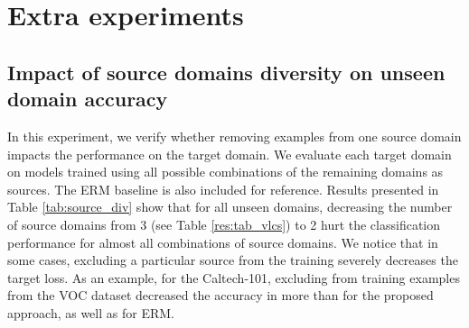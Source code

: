 \documentclass{article}
\begin{document}
\section{Extra experiments}
\subsection{Impact of source domains diversity on unseen domain accuracy}
In this experiment, we verify whether removing examples from one source domain impacts the performance on the target domain. We evaluate each target domain on models trained using all possible combinations of the remaining domains as sources. The ERM baseline is also included for reference. Results presented in Table \ref{tab:source_div} show that for all unseen domains, decreasing the number of source domains from 3 (see Table \ref{res:tab_vlcs}) to 2 hurt the classification performance for almost all combinations of source domains. We notice that in some cases, excluding a particular source from the training severely decreases the target loss. As an example, for the Caltech-101, excluding from training examples from the VOC dataset decreased the accuracy in more than  for the proposed approach, as well as for ERM.    

\begin{table}[h]
\centering
\caption{Impact of decreasing the number of source domains on VLCS. Rows represent the two source domains used.}
\label{tab:source_div}
    \label{tab:my_label}
\end{table}
\end{document}

